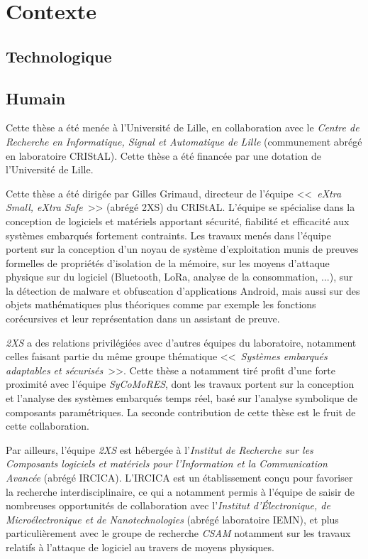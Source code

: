 
\section{Contexte}

\subsection{Technologique}

\subsection{Humain}

Cette thèse a été menée à l'Université de Lille, en collaboration avec le \emph{Centre de Recherche en Informatique, Signal et Automatique de Lille} (communement abrégé en laboratoire CRIStAL). Cette thèse a été financée par une dotation de l'Université de Lille.

Cette thèse a été dirigée par Gilles Grimaud, directeur de l'équipe <<~\emph{eXtra Small, eXtra Safe}~>> (abrégé 2XS) du CRIStAL. L'équipe se spécialise dans la conception de logiciels et matériels apportant sécurité, fiabilité et efficacité aux systèmes embarqués fortement contraints. Les travaux menés dans l'équipe portent sur la conception d'un noyau de système d'exploitation munis de preuves formelles de propriétés d'isolation de la mémoire, sur les moyens d'attaque physique sur du logiciel (Bluetooth, LoRa, analyse de la consommation, ...), sur la détection de malware et obfuscation d'applications Android, mais aussi sur des objets mathématiques plus théoriques comme par exemple les fonctions corécursives et leur représentation dans un assistant de preuve.

\emph{2XS} a des relations privilégiées avec d'autres équipes du laboratoire, notamment celles faisant partie du même groupe thématique <<~\emph{Systèmes embarqués adaptables et sécurisés}~>>. Cette thèse a notamment tiré profit d'une forte proximité avec l'équipe \emph{SyCoMoRES}, dont les travaux portent sur la conception et l’analyse des systèmes embarqués temps réel, basé sur l’analyse symbolique de composants paramétriques. La seconde contribution de cette thèse est le fruit de cette collaboration.

Par ailleurs, l'équipe \emph{2XS} est hébergée à l'\emph{Institut de Recherche sur les Composants logiciels et matériels pour l’Information et la Communication Avancée} (abrégé IRCICA). L'IRCICA est un établissement conçu pour favoriser la recherche interdisciplinaire, ce qui a notamment permis à l'équipe de saisir de nombreuses opportunités de collaboration avec l'\emph{Institut d'Électronique, de Microélectronique et de Nanotechnologies} (abrégé laboratoire IEMN), et plus particulièrement avec le groupe de recherche \emph{CSAM} notamment sur les travaux relatifs à l'attaque de logiciel au travers de moyens physiques.


